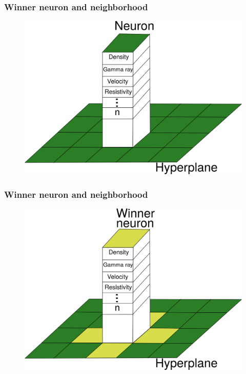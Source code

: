 \documentclass[aspectratio=10]{beamer} %
\begin{document}
\begin{frame}
	\frametitle{Winner neuron and neighborhood}
	

	\begin{figure}
		\flushright
		\includegraphics[scale=0.33]{Imagens/hiperplano.png}
		\label{vencedor1}
	\end{figure}
\end{frame}

\begin{frame}
	\frametitle{Winner neuron and neighborhood}
	
	
	\begin{figure}
		\flushright
		\includegraphics[scale=0.33]{Imagens/winner.png}
		\label{vencedor2}
	\end{figure}
\end{frame}
\end{document}
